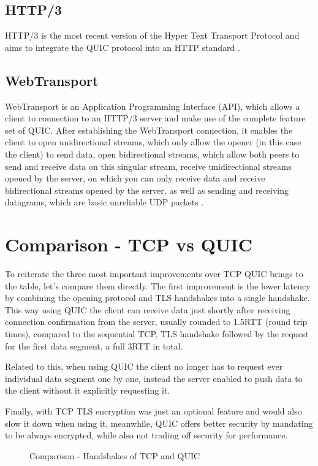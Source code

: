 \documentclass[conference]{IEEEtran}
\begin{document}
\subsection{HTTP/3}
HTTP/3 is the most recent version of the Hyper Text Transport Protocol and aims to integrate the QUIC protocol into an HTTP standard \cite{b11}.

\subsection{WebTransport}
WebTransport is an Application Programming Interface (API), which allows a client to connection to an HTTP/3 server and make use of the complete feature set of QUIC. After establishing the WebTransport connection, it enables the client to open unidirectional streams, which only allow the opener (in this case the client) to send data, open bidirectional streams, which allow both peers to send and receive data on this singular stream, receive unidirectional streams opened by the server, on which you can only receive data and receive bidirectional streams opened by the server, as well as sending and receiving datagrams, which are basic unreliable UDP packets \cite{b12}.

\section{Comparison - TCP vs QUIC}
To reiterate the three most important improvements over TCP QUIC brings to the table, let's compare them directly. The first improvement is the lower latency by combining the opening protocol and TLS handshakes into a single handshake. This way using QUIC the client can receive data just shortly after receiving connection confirmation from the server, usually rounded to 1.5RTT (round trip times), compared to the sequential TCP, TLS handshake followed by the request for the first data segment, a full 3RTT in total.

Related to this, when using QUIC the client no longer has to request ever individual data segment one by one, instead the server enabled to push data to the client without it explicitly requesting it.

Finally, with TCP TLS encryption was just an optional feature and would also slow it down when using it, meanwhile, QUIC offers better security by mandating to be always encrypted, while also not trading off security for performance. 

\begin{figure}
    \caption{Comparison - Handshakes of TCP and QUIC}
    \label{fig:handshake}
\end{figure}
\end{document}
